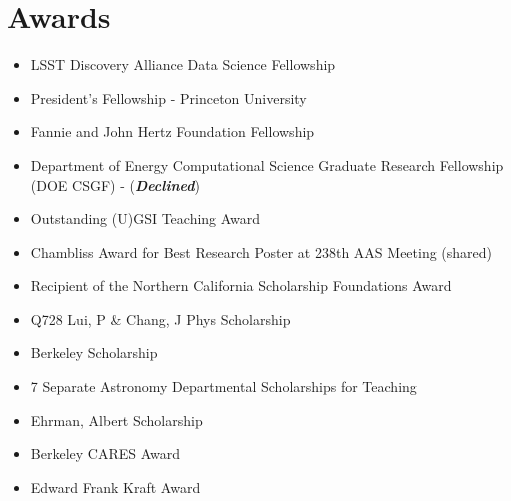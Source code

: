 \documentclass[letterpaper,10pt]{article}
\newcommand{\resumeSubHeadingListStart}{\begin{itemize}[leftmargin=*]}
\newcommand{\resumeSubHeadingListEnd}{\end{itemize}}
\newcommand{\shorterSection}[1]{\vspace{-10pt}\section{#1}}
\begin{document}
\shorterSection{Awards}
  \resumeSubHeadingListStart
  \small
    \item{LSST Discovery Alliance Data Science Fellowship}
    \vspace{-3pt}
    \item{President's Fellowship - Princeton University}
    \vspace{-3pt}
    \item{Fannie and John Hertz Foundation Fellowship}
    \vspace{-3pt}
    \item{Department of Energy Computational Science Graduate Research Fellowship (DOE CSGF) - (\textbf{\textit{Declined}})}
    \vspace{-3pt}
    \item{Outstanding (U)GSI Teaching Award}
    \vspace{-3pt}
    \item{Chambliss Award for Best Research Poster at 238th AAS Meeting (shared)}
    \vspace{-3pt}
    \item{Recipient of the Northern California Scholarship Foundations Award}
    \vspace{-3pt}
    \item{Q728 Lui, P \& Chang, J Phys Scholarship}
    \vspace{-3pt}
    \item{Berkeley Scholarship}
    \vspace{-3pt}
    \item{7 Separate Astronomy Departmental Scholarships for Teaching}
    \vspace{-3pt}
    \item{Ehrman, Albert Scholarship}
    \vspace{-3pt}
    \item{Berkeley CARES Award}
    \vspace{-3pt}
    \item{Edward Frank Kraft Award}
  \resumeSubHeadingListEnd

  
\end{document}
